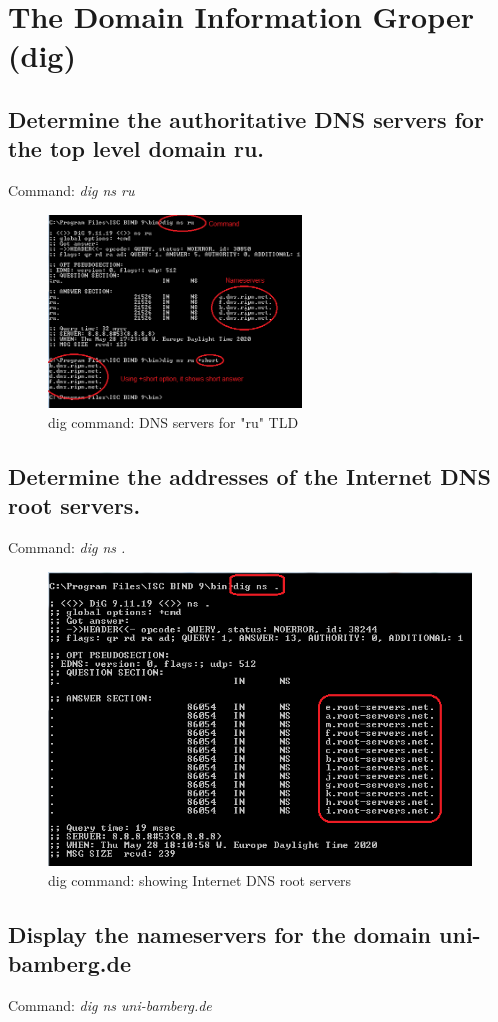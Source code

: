 \chapter{The Domain Information Groper (dig)}

\section{Determine the authoritative DNS servers for the top level domain ru.}
Command: 
\textsl{ dig ns ru}
\begin{figure}[H]
\centering
  \includegraphics[width=0.6\textwidth]{Images/Image1-1-digTLD.png}
  \caption{dig command: DNS servers for "ru" TLD }
  \label{fig:1.1}
\end{figure}
\newpage
\section {Determine the addresses of the Internet DNS root servers.}
Command: 
\textsl{ dig ns .} 
\begin{figure}[H]
\centering
  \includegraphics[width=.6\textwidth]{Images/Image1-2-DNSRoorServers.png}
  \caption{dig command: showing Internet DNS root servers}
  \label{fig:1.2}
\end{figure}
\section {Display the nameservers for the domain uni-bamberg.de}
Command: 
\textsl{ dig ns uni-bamberg.de } 

